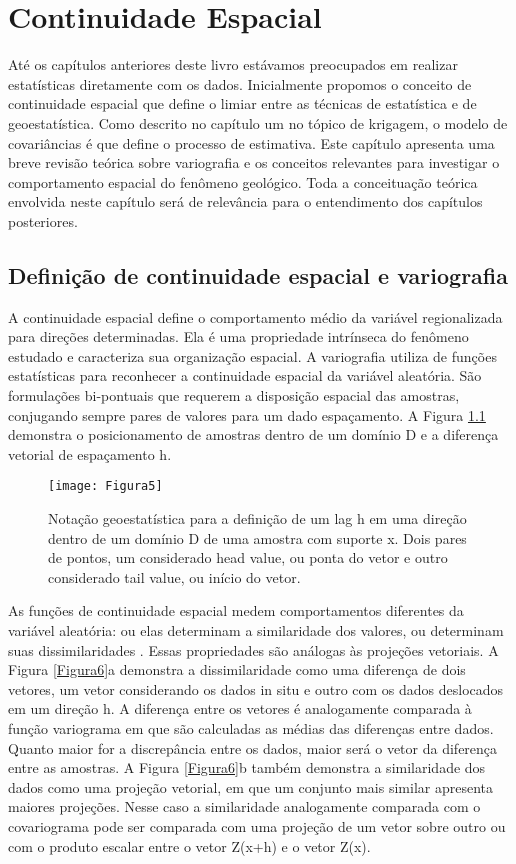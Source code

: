 \chapter{Continuidade Espacial}

Até os capítulos anteriores deste livro estávamos preocupados em realizar estatísticas diretamente com os dados. Inicialmente  propomos o conceito de continuidade espacial que define o limiar entre as técnicas de estatística e de geoestatística. Como descrito no capítulo um no tópico de krigagem, o modelo de covariâncias é que define o processo de estimativa.  Este capítulo apresenta uma breve revisão teórica sobre variografia e os conceitos relevantes para investigar o comportamento espacial do fenômeno geológico.  Toda a conceituação teórica envolvida neste capítulo será de relevância para o entendimento dos capítulos posteriores.

\section{Definição de continuidade espacial e variografia}

A continuidade espacial define o comportamento médio da variável regionalizada para direções determinadas.  Ela é uma propriedade intrínseca do fenômeno estudado e caracteriza sua organização espacial. 
A variografia utiliza de funções estatísticas para reconhecer a continuidade espacial da variável aleatória. São formulações bi-pontuais que requerem a disposição espacial das amostras, conjugando sempre pares de valores para um dado espaçamento. A Figura \ref{Figura5} demonstra o posicionamento de amostras dentro de um domínio D e a diferença vetorial de espaçamento h. 

\begin{figure}[!h]
	\centering
	\texttt{[image: Figura5]}
	\caption{Notação geoestatística para a definição de um lag h em uma direção dentro de um domínio D de uma amostra com suporte x. Dois pares de pontos, um considerado head value, ou ponta do vetor e outro considerado tail value, ou início do vetor.}
	\label{Figura5}
\end{figure}

As funções de continuidade espacial medem comportamentos diferentes da variável aleatória: ou elas determinam a similaridade dos valores, ou determinam suas dissimilaridades . Essas propriedades são análogas às projeções vetoriais. A Figura \ref{Figura6}a demonstra a dissimilaridade como uma diferença de dois vetores, um vetor considerando os dados in situ e outro com os dados deslocados em um direção h. A diferença entre os vetores é analogamente comparada à função variograma em que são calculadas as médias das diferenças entre dados. Quanto maior for a discrepância entre os dados, maior será o vetor da diferença entre as amostras. A Figura \ref{Figura6}b também demonstra a similaridade dos dados como uma projeção vetorial, em que um conjunto mais similar apresenta maiores projeções. Nesse caso a similaridade analogamente comparada com o covariograma pode ser comparada com uma projeção de um vetor sobre outro ou com o produto escalar entre o vetor Z(x+h) e o vetor Z(x).

